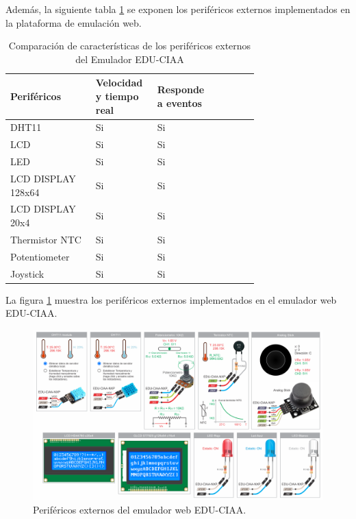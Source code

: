 Además, la siguiente tabla \ref{tab:perifericosExternosCIAA} se exponen los  periféricos externos implementados en la plataforma de emulación web.


\begin{table}[h]
\centering
\caption[Comparación de características de periféricos externos del Emulador EDU-CIAA]{Comparación de características de los periféricos externos del Emulador EDU-CIAA}
\begin{tabular}{p{0.30\linewidth} p{0.14\linewidth}  p{0.14\linewidth}  p{0.14\linewidth}}
\toprule
\textbf{Periféricos} 
& \textbf{Velocidad y tiempo real}
& \textbf{Responde a eventos}
\\
\midrule
DHT11 & Si & Si  \\
LCD & Si & Si  \\
LED & Si & Si  \\
LCD DISPLAY 128x64 & Si & Si \\
LCD DISPLAY 20x4 & Si & Si \\
Thermistor NTC & Si & Si \\
Potentiometer & Si & Si \\
Joystick & Si & Si \\
\bottomrule
\hline
\end{tabular}
\label{tab:perifericosExternosCIAA}
\end{table}


La figura \ref{fig:perifericosCIAA} muestra los periféricos externos implementados en el emulador web EDU-CIAA.

\begin{figure}[ht]
	\centering
	\includegraphics[scale=.34]{./Figures/perifericosCIAA.png}
	\caption{Periféricos externos del emulador web EDU-CIAA.}
	\label{fig:perifericosCIAA}
\end{figure}

